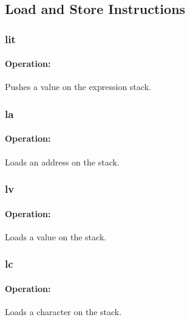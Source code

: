 \subsection{Load and Store Instructions}
\subsubsection{lit}

\paragraph{Operation:}
Pushes a value on the expression stack.

\subsubsection{la}

\paragraph{Operation:}
Loads an address on the stack.

\subsubsection{lv}

\paragraph{Operation:}
Loads a value on the stack.

\subsubsection{lc}

\paragraph{Operation:}
Loads a character on the stack.

